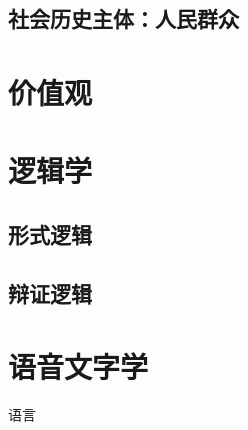 \documentclass[12pt]{book}
\begin{document}
\section{社会历史主体：人民群众}



\chapter{价值观}



\chapter{逻辑学}



\section{形式逻辑}



\section{辩证逻辑}




\chapter{语音文字学}

语言
\end{document}
